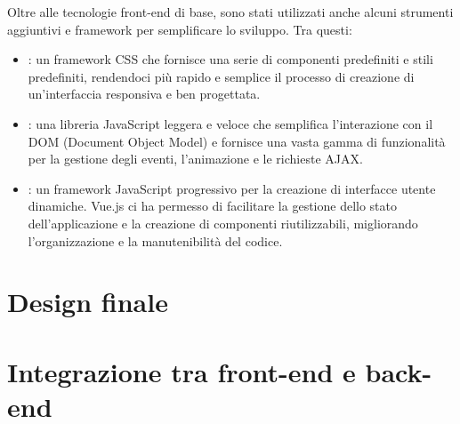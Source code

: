 \documentclass{report}
\begin{document}
Oltre alle tecnologie front-end di base, sono stati utilizzati anche alcuni strumenti aggiuntivi e framework per semplificare lo sviluppo. Tra questi:
\begin{itemize}
\item {}: un framework CSS che fornisce una serie di componenti predefiniti e stili predefiniti, rendendoci più rapido e semplice il processo di creazione di un'interfaccia responsiva e ben progettata.
\item {}: una libreria JavaScript leggera e veloce che semplifica l'interazione con il DOM (Document Object Model) e fornisce una vasta gamma di funzionalità per la gestione degli eventi, l'animazione e le richieste AJAX.
\item {}: un framework JavaScript progressivo per la creazione di interfacce utente dinamiche. Vue.js ci ha permesso di facilitare la gestione dello stato dell'applicazione e la creazione di componenti riutilizzabili, migliorando l'organizzazione e la manutenibilità del codice.
\end{itemize}

\section{Design finale}

\section{Integrazione tra front-end e back-end}
\end{document}
